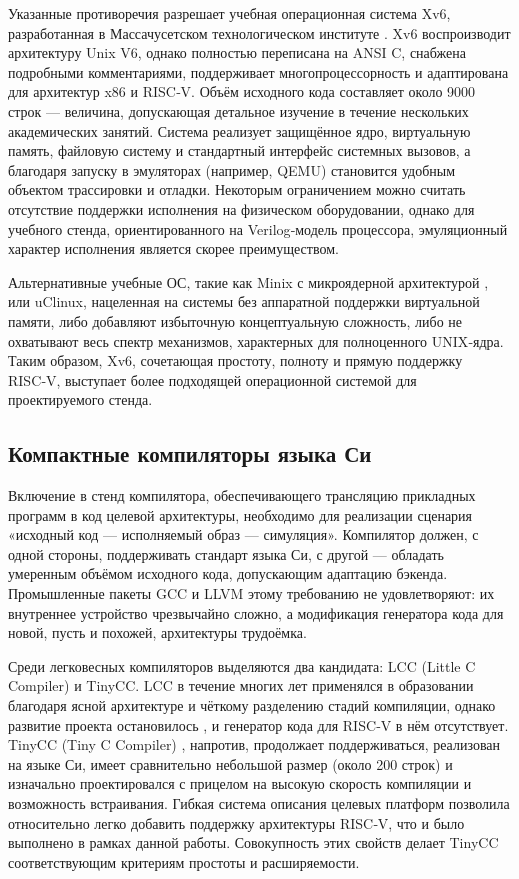 Указанные противоречия разрешает учебная операционная система Xv6, разработанная в Массачусетском технологическом институте \cite{Xv6}. Xv6 воспроизводит архитектуру Unix V6, однако полностью переписана на ANSI C, снабжена подробными комментариями, поддерживает многопроцессорность и адаптирована для архитектур x86 и RISC‑V. Объём исходного кода составляет около 9000 строк — величина, допускающая детальное изучение в течение нескольких академических занятий. Система реализует защищённое ядро, виртуальную память, файловую систему и стандартный интерфейс системных вызовов, а благодаря запуску в эмуляторах (например, QEMU) становится удобным объектом трассировки и отладки. Некоторым ограничением можно считать отсутствие поддержки исполнения на физическом оборудовании, однако для учебного стенда, ориентированного на Verilog‑модель процессора, эмуляционный характер исполнения является скорее преимуществом.

Альтернативные учебные ОС, такие как Minix с микроядерной архитектурой \cite{Minix}, или uClinux, нацеленная на системы без аппаратной поддержки виртуальной памяти, либо добавляют избыточную концептуальную сложность, либо не охватывают весь спектр механизмов, характерных для полноценного UNIX‑ядра. Таким образом, Xv6, сочетающая простоту, полноту и прямую поддержку RISC‑V, выступает более подходящей операционной системой для проектируемого стенда.

\subsection{Компактные компиляторы языка Си}

Включение в стенд компилятора, обеспечивающего трансляцию прикладных программ в код целевой архитектуры, необходимо для реализации сценария «исходный код — исполняемый образ — симуляция». Компилятор должен, с одной стороны, поддерживать стандарт языка Си, с другой — обладать умеренным объёмом исходного кода, допускающим адаптацию бэкенда. Промышленные пакеты GCC и LLVM этому требованию не удовлетворяют: их внутреннее устройство чрезвычайно сложно, а модификация генератора кода для новой, пусть и похожей, архитектуры трудоёмка.

Среди легковесных компиляторов выделяются два кандидата: LCC (Little C Compiler) и TinyCC. LCC  в течение многих лет применялся в образовании благодаря ясной архитектуре и чёткому разделению стадий компиляции, однако развитие проекта остановилось \cite{LCC}, и генератор кода для RISC‑V в нём отсутствует. TinyCC (Tiny C Compiler) \cite{TinyCC}, напротив, продолжает поддерживаться, реализован на языке Си, имеет сравнительно небольшой размер (около 200 строк) и изначально проектировался с прицелом на высокую скорость компиляции и возможность встраивания. Гибкая система описания целевых платформ позволила относительно легко добавить поддержку архитектуры RISC‑V, что и было выполнено в рамках данной работы. Совокупность этих свойств делает TinyCC соответствующим критериям простоты и расширяемости.


